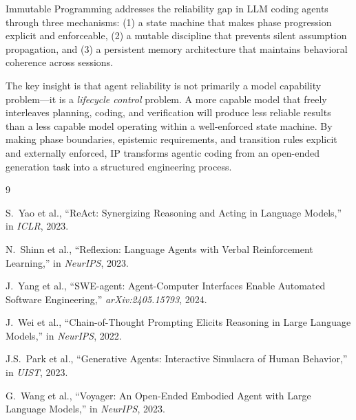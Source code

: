 \documentclass[11pt,twocolumn]{article}
\begin{document}
Immutable Programming addresses the reliability gap in LLM coding agents through three mechanisms: (1) a state machine that makes phase progression explicit and enforceable, (2) a mutable discipline that prevents silent assumption propagation, and (3) a persistent memory architecture that maintains behavioral coherence across sessions.

The key insight is that agent reliability is not primarily a model capability problem---it is a \emph{lifecycle control} problem. A more capable model that freely interleaves planning, coding, and verification will produce less reliable results than a less capable model operating within a well-enforced state machine. By making phase boundaries, epistemic requirements, and transition rules explicit and externally enforced, IP transforms agentic coding from an open-ended generation task into a structured engineering process.


\begin{thebibliography}{9}

S.~Yao et al., ``ReAct: Synergizing Reasoning and Acting in Language Models,'' in \emph{ICLR}, 2023.

N.~Shinn et al., ``Reflexion: Language Agents with Verbal Reinforcement Learning,'' in \emph{NeurIPS}, 2023.

J.~Yang et al., ``SWE-agent: Agent-Computer Interfaces Enable Automated Software Engineering,'' \emph{arXiv:2405.15793}, 2024.

J.~Wei et al., ``Chain-of-Thought Prompting Elicits Reasoning in Large Language Models,'' in \emph{NeurIPS}, 2022.

J.S.~Park et al., ``Generative Agents: Interactive Simulacra of Human Behavior,'' in \emph{UIST}, 2023.

G.~Wang et al., ``Voyager: An Open-Ended Embodied Agent with Large Language Models,'' in \emph{NeurIPS}, 2023.

\end{thebibliography}
\end{document}
